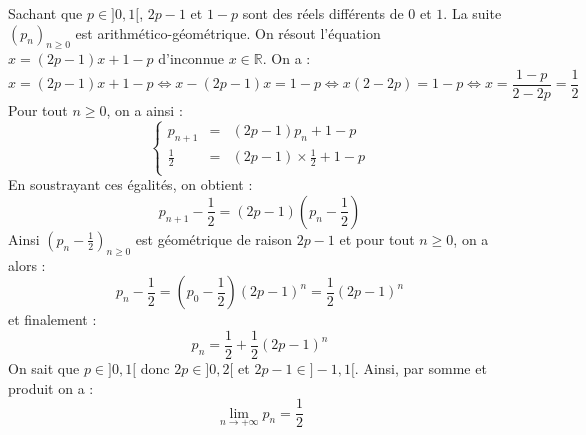 \documentclass[a4paper,twoside,french,10pt]{VcCours}
\begin{document}
\noindent Sachant que $p \in ]0,1[$, $2p-1$ et $1-p$ sont des réels différents de $0$ et $1$. La suite $(p_n)_{n \geq 0}$ est arithmético-géométrique. On résout l'équation $x=(2p-1)x+1-p$ d'inconnue $x \in \mathbb{R}$. On a :
\[ x= (2p-1)x+1-p \Longleftrightarrow x-(2p-1)x=1-p \Longleftrightarrow x(2-2p)= 1-p \Longleftrightarrow x = \frac{1-p}{2-2p} = \frac{1}{2} \]
Pour tout $n \geq 0$, on a ainsi :
\[ \left\lbrace \begin{array}{ccl}
p_{n+1} & = & (2p-1)p_n+1-p \\
\frac{1}{2} & = & (2p-1) \times \frac{1}{2} + 1-p \\
\end{array}\right.\]
En soustrayant ces égalités, on obtient :
\[ p_{n+1} - \frac{1}{2} = (2p-1)\left(p_n - \frac{1}{2} \right) \]
Ainsi $\left( p_n - \frac{1}{2} \right)_{n \geq 0}$ est géométrique de raison $2p-1$ et pour tout $n \geq 0$, on a alors :
\[ p_n - \frac{1}{2} = \left( p_0 - \frac{1}{2} \right) (2p-1)^n =  \frac{1}{2} (2p-1)^n \]
et finalement :
\[ p_n = \frac{1}{2} + \frac{1}{2} (2p-1)^n \]
On sait que $p \in ]0,1[$ donc $2p \in ]0,2[$ et $2p-1 \in ]-1,1[$. Ainsi, par somme et produit on a :
\[ \lim_{n \rightarrow + \infty} p_n = \frac{1}{2} \]
\end{document}
